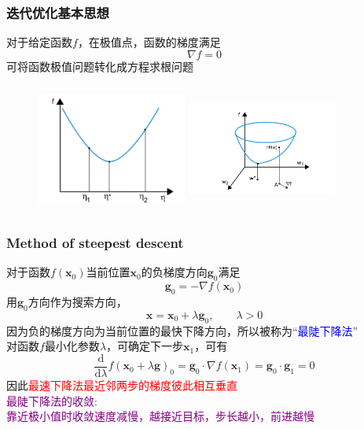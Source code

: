 \documentclass[cjk,slidestop,compress,mathserif,blue]{beamer}
\begin{document}
\frame
{
	\frametitle{迭代优化基本思想}
	对于给定函数$f$，在极值点，函数的梯度满足
	\begin{displaymath}
		\nabla f=0
	\end{displaymath}
	可将函数极值问题转化成方程求根问题
\begin{figure}[h!]
\centering
\includegraphics[height=1.68in,width=1.95in,viewport=30 0 450 360,clip]{Figures/OP_mini-1.png}
\hskip 0.05in
\includegraphics[height=1.68in,width=1.95in,viewport=150 20 560 390,clip]{Figures/OP_mini-2.png}
\label{OP_mini}
\end{figure}
}

\frame
{
	\frametitle{\textrm{Method of steepest descent}}
	对于函数$f(\mathbf{x}_0)$当前位置$\mathbf{x}_0$的负梯度方向$\mathbf{g}_0$满足
	\begin{displaymath}
		\mathbf{g}_0=-\nabla f(\mathbf{x}_0)
	\end{displaymath}
	用$\mathbf{g}_0$方向作为搜索方向，
	\begin{displaymath}
		\mathbf{x}=\mathbf{x}_0+\lambda\mathbf{g}_0,\qquad \lambda>0
	\end{displaymath}
	因为负的梯度方向为当前位置的最快下降方向，所以被称为“\textcolor{blue}{最陡下降法}”\\
	对函数$f$最小化参数$\lambda$，可确定下一步$\mathbf{x}_1$，可有
	\begin{displaymath}
		\dfrac{\mathrm{d}}{\mathrm{d}\lambda}f(\mathbf{x}_0+\lambda\mathbf{g})_0=\mathbf{g}_0\cdot\nabla f(\mathbf{x}_1)=\mathbf{g}_0\cdot\mathbf{g}_1=0
	\end{displaymath}
	因此\textcolor{red}{最速下降法最近邻两步的梯度彼此相互垂直}\\
	\textcolor{purple}{最陡下降法的收敛:~\\靠近极小值时收敛速度减慢，越接近目标，步长越小，前进越慢}
}
\end{document}
